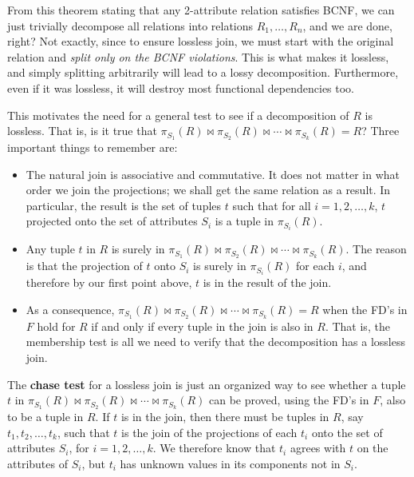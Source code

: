   From this theorem stating that any 2-attribute relation satisfies BCNF, we can just trivially decompose all relations into relations $R_1, \ldots, R_n$, and we are done, right? Not exactly, since to ensure lossless join, we must start with the original relation and \textit{split only on the BCNF violations}. This is what makes it lossless, and simply splitting arbitrarily will lead to a lossy decomposition. Furthermore, even if it was lossless, it will destroy most functional dependencies too. 

  This motivates the need for a general test to see if a decomposition of $R$ is lossless. That is, is it true that $\pi_{S_1}(R) \bowtie \pi_{S_2}(R) \bowtie \cdots \bowtie \pi_{S_k}(R) = R$? Three important things to remember are:

  \begin{itemize}
    \item The natural join is associative and commutative. It does not matter in what order we join the projections; we shall get the same relation as a result. In particular, the result is the set of tuples $t$ such that for all $i = 1, 2, \ldots, k$, $t$ projected onto the set of attributes $S_i$ is a tuple in $\pi_{S_i}(R)$.
    
    \item Any tuple $t$ in $R$ is surely in $\pi_{S_1}(R) \bowtie \pi_{S_2}(R) \bowtie \cdots \bowtie \pi_{S_k}(R)$. The reason is that the projection of $t$ onto $S_i$ is surely in $\pi_{S_i}(R)$ for each $i$, and therefore by our first point above, $t$ is in the result of the join.
    
    \item As a consequence, $\pi_{S_1}(R) \bowtie \pi_{S_2}(R) \bowtie \cdots \bowtie \pi_{S_k}(R) = R$ when the FD's in $F$ hold for $R$ if and only if every tuple in the join is also in $R$. That is, the membership test is all we need to verify that the decomposition has a lossless join.
  \end{itemize}

  \begin{theorem}
    The \textbf{chase test} for a lossless join is just an organized way to see whether a tuple $t$ in $\pi_{S_1}(R) \bowtie \pi_{S_2}(R) \bowtie \cdots \bowtie \pi_{S_k}(R)$ can be proved, using the FD's in $F$, also to be a tuple in $R$. If $t$ is in the join, then there must be tuples in $R$, say $t_1, t_2, \ldots, t_k$, such that $t$ is the join of the projections of each $t_i$ onto the set of attributes $S_i$, for $i = 1,2,\ldots,k$. We therefore know that $t_i$ agrees with $t$ on the attributes of $S_i$, but $t_i$ has unknown values in its components not in $S_i$.
  \end{theorem}

